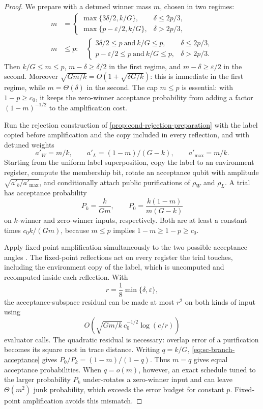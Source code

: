 \begin{proof}
We prepare with a detuned winner mass $m$, chosen in two regimes:
\begin{equation}
 \begin{aligned}
 m&=\begin{cases}
 \max\{3\delta/2,k/G\},&\delta\le2p/3,\\
 \max\{p-\varepsilon/2,k/G\},&\delta>2p/3,
 \end{cases}\\[-2pt]
 m&\le p:\quad
 \begin{cases}
 3\delta/2\le p\ \text{and}\ k/G\le p,&\delta\le2p/3,\\
 p-\varepsilon/2\le p\ \text{and}\ k/G\le p,&\delta>2p/3.
 \end{cases}
 \end{aligned}
 \label{eq:sc-detuning}
\end{equation}
Then $k/G\le m\le p$, $m-\delta\ge\delta/2$ in the first
regime, and $m-\delta\ge\varepsilon/2$ in the second.  Moreover
$\sqrt{Gm/k}=O(1+\sqrt{\delta G/k})$: this is immediate in the first
regime, while $m=\Theta(\delta)$ in the second.  The cap $m\le p$
is essential: with $1-p\ge c_0$, it keeps the zero-winner acceptance
probability from adding a factor $(1-m)^{-1/2}$ to the amplification cost.

Run the rejection construction of \cref{prop:cond-rejection-preparation}
with the label copied before amplification and the copy included in every
reflection, and with detuned weights
\[
 a'_W=m/k,\qquad a'_L=(1-m)/(G-k),\qquad a'_{\max}=m/k.
\]
Starting from the uniform label superposition, copy the label to an
environment register, compute the membership bit, rotate an acceptance
qubit with amplitude $\sqrt{a'_b/a'_{\max}}$, and conditionally attach
public purifications of $\rho_W$ and $\rho_L$.  A trial has acceptance
probability
\begin{equation}
 P_k=\frac{k}{Gm},\qquad
 P_0=\frac{k(1-m)}{m(G-k)}
 \label{eq:sc-branch-acceptance}
\end{equation}
on $k$-winner and zero-winner inputs, respectively.  Both are at least a
constant times $c_0k/(Gm)$, because $m\le p$ implies
$1-m\ge1-p\ge c_0$.

Apply fixed-point amplification simultaneously to the two possible
acceptance angles \cite{yoder2014-fixed-point-quantum-search}.  The
fixed-point reflections act on every register the trial touches, including
the environment copy of the label, which is uncomputed and recomputed inside
each reflection.  With
\[
 r=\frac18\min\{\delta,\varepsilon\},
\]
the acceptance-subspace residual can be made at most $r^2$ on both kinds of input
using
\[
 O\!\left(\sqrt{Gm/k}\,c_0^{-1/2}\log(e/r)\right)
\]
evaluator calls.  The quadratic residual is necessary: overlap error of a
purification becomes its square root in trace distance.  Writing $q=k/G$,
\eqref{eq:sc-branch-acceptance} gives
$P_0/P_k=(1-m)/(1-q)$.  Thus $m=q$ gives equal acceptance probabilities.  When
$q=o(m)$, however, an exact schedule tuned to the larger probability $P_k$
under-rotates a zero-winner input and can leave $\Theta(m^2)$ junk probability,
which exceeds the error budget for constant $p$.  Fixed-point amplification avoids
this mismatch.


\end{proof}
